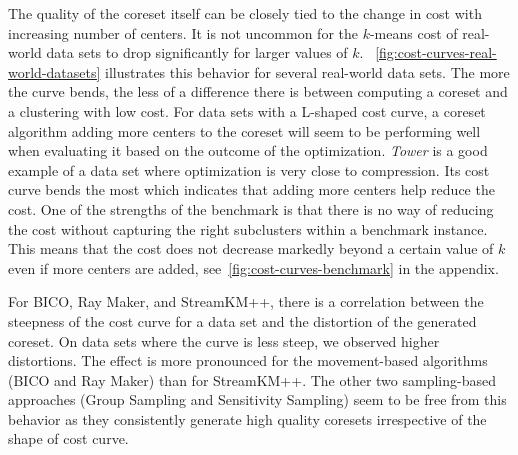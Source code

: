 The quality of the coreset itself can be closely tied to the change in cost with increasing number of centers. It is not uncommon for the $k$-means cost of real-world data sets to drop significantly for larger values of $k$.
~\cref{fig:cost-curves-real-world-datasets} illustrates this behavior for several real-world data sets. The more the curve bends, the less of a difference there is between computing a coreset and a clustering with low cost. For data sets with a L-shaped cost curve, a coreset algorithm adding more centers to the coreset will seem to be performing well when evaluating it based on the outcome of the optimization.
\textit{Tower} is a good example of a data set where optimization is very close to compression. Its cost curve bends the most which indicates that adding more centers help reduce the cost. One of the strengths of the benchmark is that there is no way of reducing the cost without capturing the right subclusters within a benchmark instance. This means that the cost does not decrease markedly beyond a certain value of $k$ even if more centers are added, see~\cref{fig:cost-curves-benchmark} in the appendix. 

For BICO, Ray Maker, and StreamKM++, there is a correlation between the steepness of the cost curve for a data set and the distortion of the generated coreset. 
On data sets where the curve is less steep, we observed higher distortions. The effect is more pronounced for the movement-based algorithms (BICO and Ray Maker) than for StreamKM++. The other two sampling-based approaches (Group Sampling and Sensitivity Sampling) seem to be free from this behavior as they consistently generate high quality coresets irrespective of the shape of cost curve.







